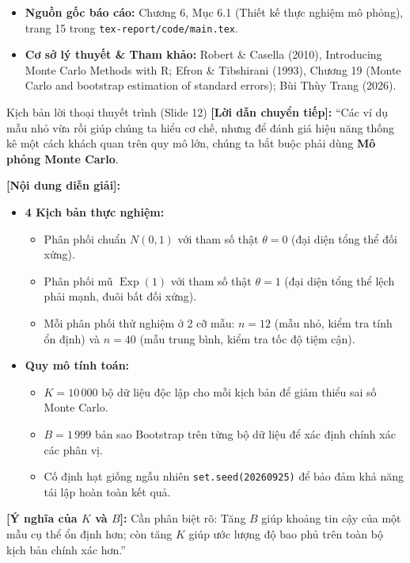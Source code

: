 \documentclass[10pt,a4paper]{article}
\begin{document}
\begin{itemize}
    \item \textbf{Nguồn gốc báo cáo:} Chương 6, Mục 6.1 (Thiết kế thực nghiệm mô phỏng), trang 15 trong \texttt{tex-report/code/main.tex}.
    \item \textbf{Cơ sở lý thuyết \& Tham khảo:} Robert \& Casella (2010), Introducing Monte Carlo Methods with R; Efron \& Tibshirani (1993), Chương 19 (Monte Carlo and bootstrap estimation of standard errors); Bùi Thùy Trang (2026).
\end{itemize}

\begin{scriptbox}{Kịch bản lời thoại thuyết trình (Slide 12)}
    \textbf{[Lời dẫn chuyển tiếp]:} ``Các ví dụ mẫu nhỏ vừa rồi giúp chúng ta hiểu cơ chế, nhưng để đánh giá hiệu năng thống kê một cách khách quan trên quy mô lớn, chúng ta bắt buộc phải dùng \textbf{Mô phỏng Monte Carlo}.
    
    \textbf{[Nội dung diễn giải]:} 
    \begin{itemize}
        \item \textbf{4 Kịch bản thực nghiệm:}
        \begin{itemize}
            \item Phân phối chuẩn $N(0, 1)$ với tham số thật $\theta = 0$ (đại diện tổng thể đối xứng).
            \item Phân phối mũ $\operatorname{Exp}(1)$ với tham số thật $\theta = 1$ (đại diện tổng thể lệch phải mạnh, đuôi bất đối xứng).
            \item Mỗi phân phối thử nghiệm ở 2 cỡ mẫu: $n=12$ (mẫu nhỏ, kiểm tra tính ổn định) và $n=40$ (mẫu trung bình, kiểm tra tốc độ tiệm cận).
        \end{itemize}
        \item \textbf{Quy mô tính toán:}
        \begin{itemize}
            \item $K = 10\,000$ bộ dữ liệu độc lập cho mỗi kịch bản để giảm thiểu sai số Monte Carlo.
            \item $B = 1\,999$ bản sao Bootstrap trên từng bộ dữ liệu để xác định chính xác các phân vị.
            \item Cố định hạt giống ngẫu nhiên \texttt{set.seed(20260925)} để bảo đảm khả năng tái lập hoàn toàn kết quả.
        \end{itemize}
    \end{itemize}
    \textbf{[Ý nghĩa của $K$ và $B$]:} Cần phân biệt rõ: Tăng $B$ giúp khoảng tin cậy của một mẫu cụ thể ổn định hơn; còn tăng $K$ giúp ước lượng độ bao phủ trên toàn bộ kịch bản chính xác hơn.''
\end{scriptbox}
\end{document}
